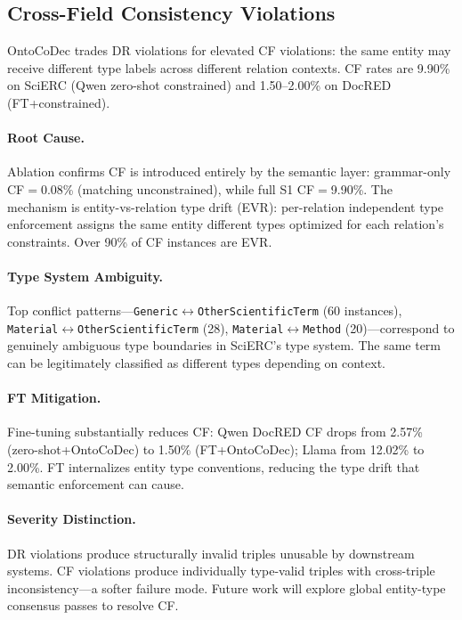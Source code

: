 \documentclass[11pt,a4paper]{article}
\newcommand{\sys}{OntoCoDec}
\begin{document}
\subsection{Cross-Field Consistency Violations}
\label{sec:cf}

\sys{} trades DR violations for elevated CF violations: the same entity may receive different type labels across different relation contexts.
CF rates are 9.90\% on SciERC (Qwen zero-shot constrained) and 1.50--2.00\% on DocRED (FT+constrained).

\paragraph{Root Cause.}
Ablation confirms CF is introduced entirely by the semantic layer: grammar-only CF$=$0.08\% (matching unconstrained), while full S1 CF$=$9.90\%.
The mechanism is entity-vs-relation type drift (EVR): per-relation independent type enforcement assigns the same entity different types optimized for each relation's constraints.
Over 90\% of CF instances are EVR.

\paragraph{Type System Ambiguity.}
Top conflict patterns---\texttt{Generic}$\leftrightarrow$\texttt{OtherScientificTerm} (60 instances), \texttt{Material}$\leftrightarrow$\texttt{OtherScientificTerm} (28), \texttt{Material}$\leftrightarrow$\texttt{Method} (20)---correspond to genuinely ambiguous type boundaries in SciERC's type system.
The same term can be legitimately classified as different types depending on context.

\paragraph{FT Mitigation.}
Fine-tuning substantially reduces CF: Qwen DocRED CF drops from 2.57\% (zero-shot+\sys{}) to 1.50\% (FT+\sys{}); Llama from 12.02\% to 2.00\%.
FT internalizes entity type conventions, reducing the type drift that semantic enforcement can cause.

\paragraph{Severity Distinction.}
DR violations produce structurally invalid triples unusable by downstream systems.
CF violations produce individually type-valid triples with cross-triple inconsistency---a softer failure mode.
Future work will explore global entity-type consensus passes to resolve CF.
\end{document}
